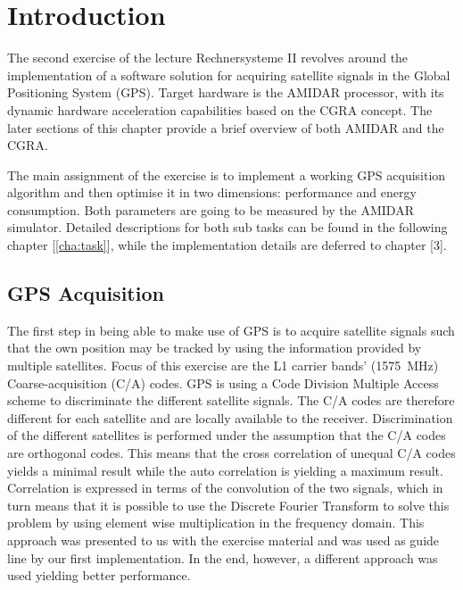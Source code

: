 \chapter{Introduction}
\label{cha:intro}
	The second exercise of the lecture Rechnersysteme II revolves around the implementation of a software solution for acquiring satellite signals in the Global Positioning System (GPS). Target hardware is the AMIDAR processor, with its dynamic hardware acceleration capabilities based on the CGRA concept. The later sections of this chapter provide a brief overview of both AMIDAR and the CGRA.

	The main assignment of the exercise is to implement a working GPS acquisition algorithm and then optimise it in two dimensions: performance and energy consumption. Both parameters are going to be measured by the AMIDAR simulator. Detailed descriptions for both sub tasks can be found in the following chapter [\ref{cha:task}], while the implementation details are deferred to chapter [\num{3}].

	\section{GPS Acquisition} %
	\label{sec:intro_acq}
		The first step in being able to make use of GPS is to acquire satellite signals such that the own position may be tracked by using the information provided by multiple satellites.
		Focus of this exercise are the L1 carrier bands' (\SI{1575}{\mega\hertz}) Coarse-acquisition (C/A) codes. GPS is using a Code Division Multiple Access scheme to discriminate the different satellite signals. The C/A codes are therefore different for each satellite and are locally available to the receiver. 
		Discrimination of the different satellites is performed under the assumption that the C/A codes are orthogonal codes. This means that the cross correlation of unequal C/A codes yields a minimal result while the auto correlation is yielding a maximum result. Correlation is expressed in terms of the convolution of the two signals, which in turn means that it is possible to use the Discrete Fourier Transform to solve this problem by using element wise multiplication in the frequency domain. This approach was presented to us with the exercise material and was used as guide line by our first implementation. In the end, however, a different approach was used yielding better performance. 

